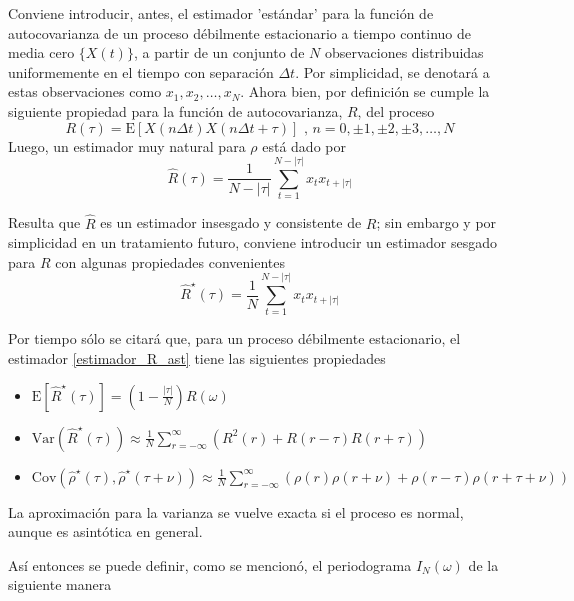 \documentclass[12pt,a4paper]{mitthesis}
\newcommand{\aste}[1]{\widehat{ #1 }^{\star}}
\newcommand{\E}[1]{\mathrm{E}\left[ #1 \right]}
\newcommand{\Var}[1]{\mathrm{Var}\left( #1 \right)}
\newcommand{\Cov}[1]{\mathrm{Cov}\left( #1 \right)}
\newcommand{\abso}[1]{\left| #1 \right|}
\begin{document}
Conviene introducir, antes, el estimador 'est\'andar' para la funci\'on de autocovarianza de un 
proceso d\'ebilmente estacionario a tiempo continuo de media cero $\{ X(t) \}$, a partir de un 
conjunto de $N$ observaciones distribuidas uniformemente en el tiempo con separaci\'on $\Delta t$.
Por simplicidad, se denotar\'a a estas observaciones como $x_1, x_2 , \dots, x_N$. Ahora bien, por 
definici\'on se cumple la siguiente propiedad para la funci\'on de autocovarianza, $R$, del proceso
\begin{equation*}
R(\tau) = \E{X(n\Delta t)X(n\Delta t + \tau)} \text{  ,  } n = 0,\pm 1,\pm 2, \pm 3,\dots, N
\end{equation*}
Luego, un estimador muy natural para $\rho$ est\'a dado por
\begin{equation}
\widehat{R}(\tau) = \frac{1}{N-\abso{\tau}} 
\sum_{t = 1}^{N-\abso{\tau}} x_t x_{t+\abso{\tau}}
\label{estimador_R}
\end{equation}

Resulta que $\widehat{R}$ es un estimador insesgado y consistente de $R$; sin embargo y por 
simplicidad en un tratamiento futuro, conviene introducir un estimador sesgado para $R$ con algunas 
propiedades convenientes
\begin{equation}
\aste{R}(\tau) = \frac{1}{N} 
\sum_{t = 1}^{N-\abso{\tau}} x_t x_{t+\abso{\tau}}
\label{estimador_R_ast}
\end{equation}

Por tiempo s\'olo se citar\'a que, para un proceso d\'ebilmente estacionario, el estimador 
\ref{estimador_R_ast} tiene las siguientes propiedades
\begin{itemize}
\item $\E{\aste{R}(\tau)} = \left(1 - \frac{\abso{\tau}}{N} \right) R(\omega)$
\item $\Var{\aste{R}(\tau)} \approx \frac{1}{N} 
\sum_{r=-\infty}^{\infty} \left( R^{2}(r) + R(r-\tau)R(r+\tau) \right)$
\item $\Cov{\aste{\rho}(\tau),\aste{\rho}(\tau+\nu)} \approx \frac{1}{N} 
\sum_{r=-\infty}^{\infty} \left( \rho(r)\rho(r+\nu) + \rho(r-\tau)\rho(r+\tau+\nu) \right)$
\end{itemize}
La aproximaci\'on para la varianza se vuelve exacta si el proceso es normal, aunque es asint\'otica 
en general.

As\'i entonces se puede definir, como se mencion\'o, el periodograma $I_N(\omega)$ de la siguiente 
manera
\end{document}
